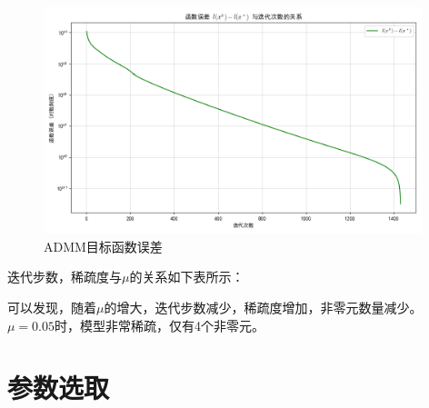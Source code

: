 \documentclass[cn,hazy,black,11pt,normal]{elegantnote}
\begin{document}
        \begin{figure}[H]
            \centering
            \includegraphics[width=0.98\textwidth]{image/function_error_cn}
            \caption{ADMM目标函数误差}
            \label{fig:function_error}
        \end{figure}

        迭代步数，稀疏度与$\mu$的关系如下表所示：

        \begin{table}[H]
            \centering
            \caption{ADMM迭代步数与稀疏度}
            \label{tab:admm_iterations}
        \end{table}

        可以发现，随着$\mu$的增大，迭代步数减少，稀疏度增加，非零元数量减少。$\mu=0.05$时，模型非常稀疏，仅有4个非零元。

    \section{参数选取}
\end{document}
